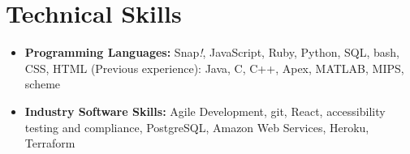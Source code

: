 \section{Technical Skills}

\vspace{6pt}

\begin{itemize}

  \setlength\itemsep{1em}

    \item \textbf{Programming Languages:}
    \newline
    Snap\textit{!}, JavaScript, Ruby, Python, SQL, bash, CSS, HTML
    \newline
    \small (Previous experience): Java, C, C++, Apex, MATLAB, MIPS, scheme
    \vspace{6pt}
    
    \item \textbf{Industry Software Skills:}
    \newline
    Agile Development, git, React, accessibility testing and compliance, PostgreSQL, Amazon Web Services, Heroku, Terraform


\end{itemize}







